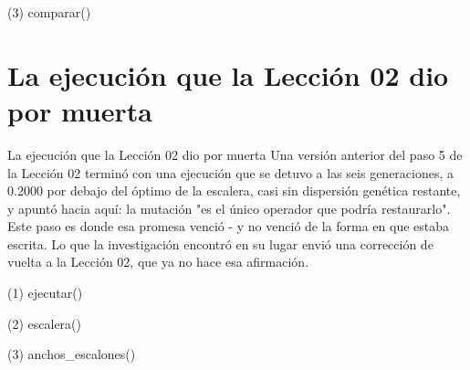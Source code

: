 \begin{frame}[fragile]{(3) comparar()}

\end{frame}


\section{La ejecución que la Lección 02 dio por muerta}

\begin{frame}{La ejecución que la Lección 02 dio por muerta}
Una versión anterior del paso 5 de la Lección 02 terminó con una ejecución que se detuvo a las seis
generaciones, a 0.2000 por debajo del óptimo de la escalera, casi sin dispersión genética
restante, y apuntó hacia aquí: la mutación "es el único operador que podría restaurarlo". Este paso es donde esa promesa
venció - y no venció de la forma
en que estaba escrita. Lo que la investigación encontró en su lugar envió una corrección de vuelta a
la Lección 02, que ya no hace esa afirmación.
\end{frame}

\begin{frame}[fragile]{(1) ejecutar()}

\end{frame}

\begin{frame}[fragile]{(2) escalera()}

\end{frame}

\begin{frame}[fragile]{(3) anchos\_escalones()}

\end{frame}

